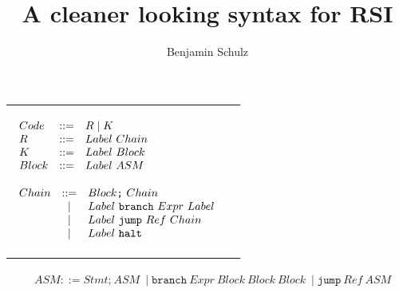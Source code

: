 \documentclass[a4paper,10pt]{article}
\title{A cleaner looking syntax for RSI}
\author{Benjamin Schulz}
\begin{document}
\maketitle


\section{}

\begin{tabular*}{10cm}[]{lc}
{
\begin{minipage}[t]{3.5cm}

\scriptsize{

$
\begin{array}[t]{lcl}

Code &::=& R \mid K\\
R &::=& Label\ Chain\\
K &::=& Label\ Block\\
Block &::=& Label\ ASM\\
\end{array}
$

}  %

\end{minipage}
}

{
\begin{minipage}[t]{1.85in}

\begin{scriptsize}

$
\begin{array}[t]{lcl}

Chain &::=& Block\texttt{;}\ Chain\\
&\mid& Label\ \texttt{branch}\ Expr\ Label\\
&\mid& Label\ \texttt{jump}\ Ref\ Chain\\
&\mid& Label\ \texttt{halt}\\
\end{array}
$
\end{scriptsize}
\end{minipage}
}
\end{tabular*}

\medskip
\scriptsize
{\ \ \ \ \ $ASM ::= Stmt\texttt{;}\ ASM\ \mid \texttt{branch}\ Expr\ Block\ Block\ Block\ \mid \texttt{jump}\ Ref\ ASM$}
\end{document}
